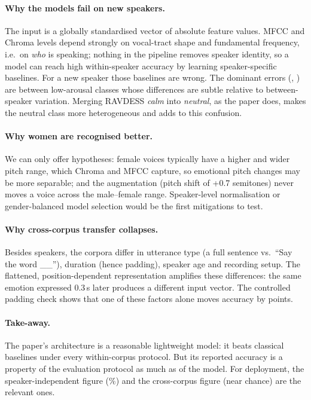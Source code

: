 \paragraph{Why the models fail on new speakers.} The input is a globally standardised vector of absolute feature
values. MFCC and Chroma levels depend strongly on vocal-tract shape and fundamental frequency, i.e.\ on
\emph{who} is speaking; nothing in the pipeline removes speaker identity, so a model can reach high within-speaker
accuracy by learning speaker-specific baselines. For a new speaker those baselines are wrong. The dominant errors
(\ConfOne, \ConfTwo) are between low-arousal classes whose differences are subtle relative to between-speaker
variation. Merging RAVDESS \emph{calm} into \emph{neutral}, as the paper does, makes the neutral class more
heterogeneous and adds to this confusion.

\paragraph{Why women are recognised better.} We can only offer hypotheses: female voices typically have a higher and
wider pitch range, which Chroma and MFCC capture, so emotional pitch changes may be more separable; and the
augmentation (pitch shift of +0.7 semitones) never moves a voice across the male--female range. Speaker-level
normalisation or gender-balanced model selection would be the first mitigations to test.

\paragraph{Why cross-corpus transfer collapses.} Besides speakers, the corpora differ in utterance type (a full
sentence vs.\ ``Say the word \_\_''), duration (hence padding), speaker age and recording setup. The flattened,
position-dependent representation amplifies these differences: the same emotion expressed 0.3\,s later produces a
different input vector. The controlled padding check shows that one of these factors alone moves accuracy by
\OffsetGain{} points.

\paragraph{Take-away.} The paper's architecture is a reasonable lightweight model: it beats classical baselines under
every within-corpus protocol. But its reported accuracy is a property of the evaluation protocol as much as of the
model. For deployment, the speaker-independent figure (\AccSpkEns\%) and the cross-corpus figure (near chance)
are the relevant ones.
